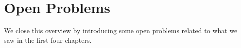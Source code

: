 \chapter{Open Problems}

We close this overview by introducing some open problems related to what we saw in the first four chapters.


